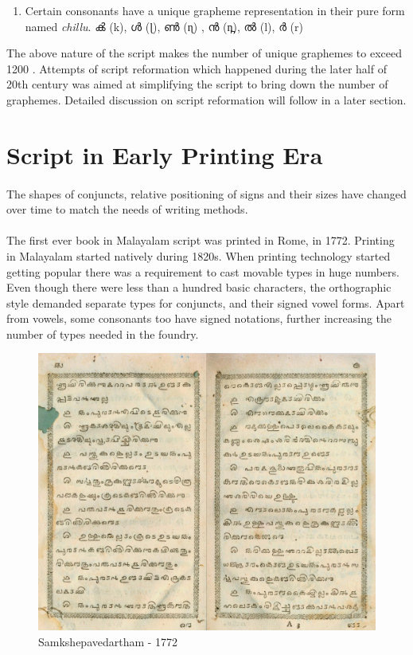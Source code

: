 \documentclass[10pt]{article}
\begin{document}
\begin{enumerate}
	
	\item 
	Certain consonants have a unique grapheme representation in their pure form named \textit{chillu}. {\manjari ൿ} (k), {\manjari ൾ} (ɭ), {\manjari ൺ} (ɳ) , {\manjari ൻ} (n̪), {\manjari ൽ} (l), {\manjari ർ} (r)
\end{enumerate}

The above nature of the script makes the number of unique graphemes to exceed 1200\cite{clement} . Attempts of script reformation which happened during the later half of 20th century was aimed at simplifying the script to bring down the number of graphemes. Detailed discussion on script reformation will follow in a later section.

\section{Script in Early Printing Era}

\paragraph{}
The shapes of conjuncts, relative positioning of signs and their sizes have changed over time to match the needs of writing methods.

\paragraph{}
The first ever book in Malayalam script was printed in Rome, in 1772. Printing in Malayalam started natively during 1820s\cite{babucherian}. When printing technology started getting popular there was a requirement to cast movable types in huge numbers. Even though there were less than a hundred basic characters, the orthographic style demanded separate types for conjuncts, and their signed vowel forms. Apart from vowels, some consonants too have signed notations, further increasing the number of types needed in the foundry. 

\begin{figure}[h!]
	\centering
	\includegraphics[width=\textwidth]{images/samkshepavedartham1772.png}
	\caption{Samkshepavedartham - 1772}
	\label{Samkshepam}
\end{figure} 
\end{document}
